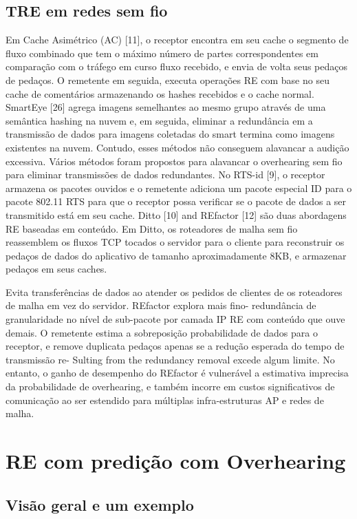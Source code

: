 \documentclass[12pt]{article}
\begin{document}
\subsection{TRE em redes sem fio}


Em Cache Asimétrico (AC) [11], o receptor encontra em
seu cache o segmento de fluxo combinado que tem o máximo
número de partes correspondentes em comparação com o tráfego em curso
fluxo recebido, e envia de volta seus pedaços de pedaços. O remetente
em seguida, executa operações RE com base no seu cache de comentários
armazenando os hashes recebidos e o cache normal. SmartEye [26]
agrega imagens semelhantes ao mesmo grupo através de uma semântica
hashing na nuvem e, em seguida, eliminar a redundância em
a transmissão de dados para imagens coletadas do smart
termina como imagens existentes na nuvem. Contudo,
esses métodos não conseguem alavancar a audição excessiva. Vários métodos
foram propostos para alavancar o overhearing sem fio para eliminar
transmissões de dados redundantes. No RTS-id [9], o receptor
armazena os pacotes ouvidos e o remetente adiciona um pacote especial
ID para o pacote 802.11 RTS para que o receptor possa verificar se
o pacote de dados a ser transmitido está em seu cache. Ditto [10] and
REfactor [12] são duas abordagens RE baseadas em conteúdo. Em Ditto,
os roteadores de malha sem fio reassemblem os fluxos TCP tocados
o servidor para o cliente para reconstruir os pedaços de dados do aplicativo
de tamanho aproximadamente 8KB, e armazenar pedaços em seus caches.


Evita transferências de dados ao atender os pedidos de clientes de
os roteadores de malha em vez do servidor. REfactor explora mais fino-
redundância de granularidade no nível de sub-pacote por camada IP RE
com conteúdo que ouve demais. O remetente estima a sobreposição
probabilidade de dados para o receptor, e remove duplicata
pedaços apenas se a redução esperada do tempo de transmissão re-
Sulting from the redundancy removal excede algum limite.
No entanto, o ganho de desempenho do REfactor é vulnerável a
estimativa imprecisa da probabilidade de overhearing, e também
incorre em custos significativos de comunicação ao ser estendido
para múltiplas infra-estruturas AP e redes de malha.

\section{	RE com predição com Overhearing}
\subsection{Visão geral e um exemplo}
\end{document}
